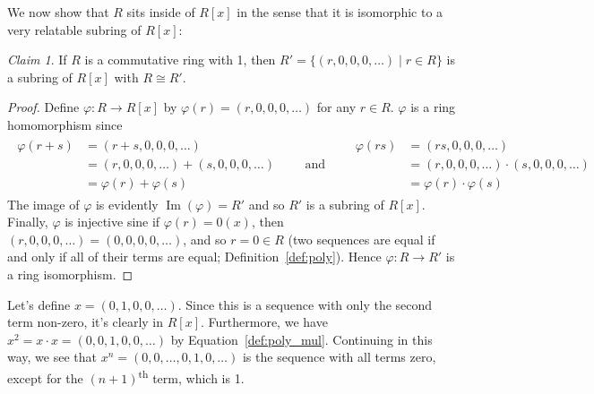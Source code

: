 \documentclass[12pt,letterpaper,DIV=11,final]{scrartcl}
\theoremstyle{plain}
\theoremstyle{definition}
\theoremstyle{remark}
\newtheorem{claim}{Claim}
\DeclareMathOperator{\ima}{Im}
\begin{document}
We now show that $R$ sits inside of $R[x]$ in the sense that it is isomorphic to a very relatable subring of $R[x]$:

\begin{claim}\label{claim:commutativering_subring}
  If $R$ is a commutative ring with 1, then $R' = \{ (r, 0, 0, 0, \dots) \mid r \in R \}$ is a subring of $R[x]$ with $R \cong R'$.

  \begin{proof}
    Define $\varphi : R \to R[x]$ by $\varphi(r) = (r, 0, 0, 0, \dots)$ for any $r \in R$.
    $\varphi$ is a ring homomorphism since
    \begin{align*}
      \begin{aligned}
        \varphi(r + s) &= (r + s, 0, 0, 0, \dots) \\
                       &= (r, 0, 0, 0, \dots) + (s, 0, 0, 0, \dots) \\
                       &= \varphi(r) + \varphi(s)
      \end{aligned}
      \qquad \text{and} \qquad
      \begin{aligned}
        \varphi(rs) &= (rs, 0, 0, 0, \dots) \\
                    &= (r, 0, 0, 0, \dots) \cdot (s, 0, 0, 0, \dots) \\
                    &= \varphi(r) \cdot \varphi(s)
      \end{aligned}
    \end{align*}
    The image of $\varphi$ is evidently $\ima(\varphi) = R'$ and so $R'$ is a subring of $R[x]$.
    Finally, $\varphi$ is injective sine if $\varphi(r) = 0(x)$, then $(r, 0, 0, 0, \dots) = (0, 0, 0, 0, \dots)$, and so $r = 0 \in R$ (two sequences are equal if and only if all of their terms are equal; Definition~\ref{def:poly}).
    Hence $\varphi : R \to R'$ is a ring isomorphism.
  \end{proof}
\end{claim}

Let's define $x = (0, 1, 0, 0, \dots)$.
Since this is a sequence with only the second term non-zero, it's clearly in $R[x]$.
Furthermore, we have $x^2 = x \cdot x = (0, 0, 1, 0, 0, \dots)$ by Equation~\ref{def:poly_mul}.
Continuing in this way, we see that $x^n = (0, 0, \dots, 0, 1, 0, \dots)$ is the sequence with all terms zero, except for the $(n + 1)$\textsuperscript{th} term, which is 1.
\end{document}

